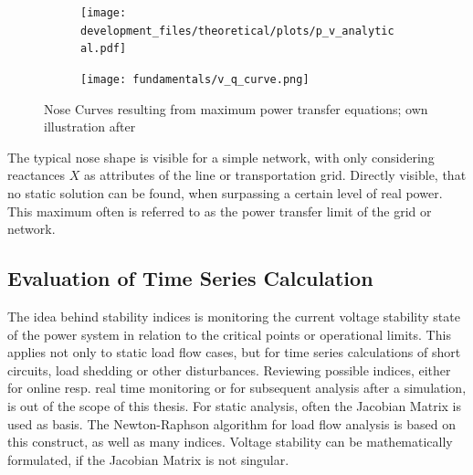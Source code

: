 \begin{figure}[htbp!]
    \centering
    \begin{subfigure}[b]{.49\linewidth}
        \texttt{[image: development\_files/theoretical/plots/p\_v\_analytical.pdf]}
    \end{subfigure}
    \begin{subfigure}[b]{.49\linewidth}
        \texttt{[image: fundamentals/v\_q\_curve.png]}
    \end{subfigure}
    \caption[Nose Curves resulting from maximum power transfer equations]{Nose Curves resulting from maximum power transfer equations; own illustration after \autocite{machowski_2020,kundur_2022,cutsem_1998}}
    \label{fig:v-stability-system}
\end{figure}

The typical nose shape is visible for a simple network, with only considering reactances $X$ as attributes of the line or transportation grid.
Directly visible, that no static solution can be found, when surpassing a certain level of real power. 
This maximum often is referred to as the power transfer limit of the grid or network.




\subsection{Evaluation of Time Series Calculation}
\label{sec:stability-indices}

The idea behind stability indices is monitoring the current voltage stability state of the power system in relation to the critical points or operational limits.
This applies not only to static load flow cases, but for time series calculations of short circuits, load shedding or other disturbances.
Reviewing possible indices, either for online resp. real time monitoring or for subsequent analysis after a simulation, is out of the scope of this thesis.
For static analysis, often the Jacobian Matrix is used as basis.
The Newton-Raphson algorithm for load flow analysis is based on this construct, as well as many indices.
Voltage stability can be mathematically formulated, if the Jacobian Matrix is not singular.


